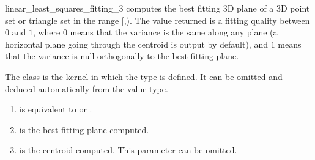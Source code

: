 \begin{ccRefFunction}{linear_least_squares_fitting_3}
{ computes the best fitting 3D plane of a 3D point set or triangle set in the range
[,). The value returned is a fitting quality
between $0$ and $1$, where $0$ means that the variance is the same
along any plane (a horizontal plane going through the centroid is output
by default), and $1$ means that the variance is null orthogonally
to the best fitting plane. }

The class  is the kernel in which the type
 is defined. It can be omitted and
deduced automatically from the value type.


\begin{enumerate}
   \item  {} is equivalent to  or .
   \item  {} is the best fitting plane computed.
   \item  {} is the centroid computed. This parameter can be
          omitted.
\end{enumerate}


\end{ccRefFunction}
